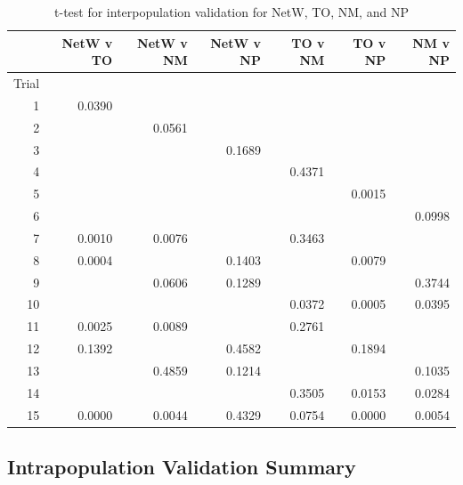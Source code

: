 \begin{table}[htbp]
  \centering
  \caption{t-test for interpopulation validation for NetW, TO, NM, and NP}
    \begin{tabular}{rrrrrrr}
    \toprule
          & NetW v TO & NetW v NM & NetW v NP & TO v NM & TO v NP & NM v NP \\
    \midrule
    Trial &           &           &           &         &         &  \\
    1     & 0.0390    &           &           &         &         &  \\
    2     &           & 0.0561    &           &         &         &  \\
    3     &           &           & 0.1689    &         &         &  \\
    4     &           &           &           & 0.4371  &         &  \\
    5     &           &           &           &         & 0.0015  &  \\
    6     &           &           &           &         &         & 0.0998 \\
    7     & 0.0010    & 0.0076    &           & 0.3463  &         &  \\
    8     & 0.0004    &           & 0.1403    &         & 0.0079  &  \\
    9     &           & 0.0606    & 0.1289    &         &         & 0.3744 \\
    10    &           &           &           & 0.0372  & 0.0005  & 0.0395 \\
    11    & 0.0025    & 0.0089    &           & 0.2761  &         &  \\
    12    & 0.1392    &           & 0.4582    &         & 0.1894  &  \\
    13    &           & 0.4859    & 0.1214    &         &         & 0.1035 \\
    14    &           &           &           & 0.3505  & 0.0153  & 0.0284 \\
    15    & 0.0000    & 0.0044    & 0.4329    & 0.0754  & 0.0000  & 0.0054 \\
    \bottomrule
    \end{tabular}%
  \label{tab:interpop_ttest3}%
\end{table}%

\subsection{Intrapopulation Validation Summary}

